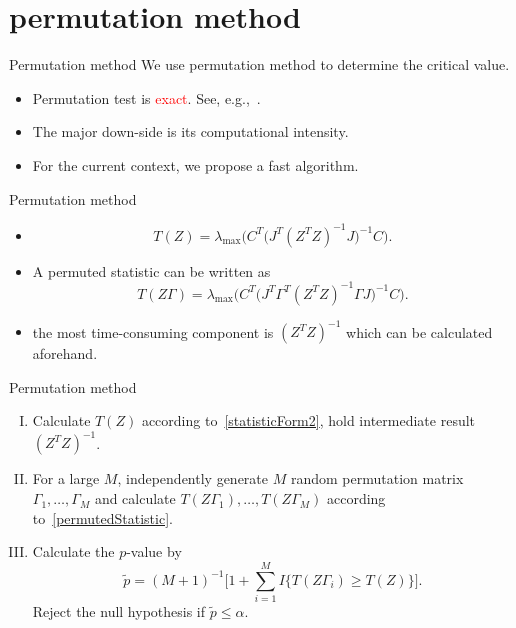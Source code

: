 \documentclass{beamer}
\theoremstyle{plain}
\theoremstyle{definition}
\theoremstyle{remark}
\begin{document}
\section{permutation method}
\begin{frame}{Permutation method}
    We use permutation method to determine the critical value.
    \begin{itemize}
        \item
            Permutation test is \textcolor{red}{exact}. See, e.g.,~\cite{Lehmann}.
        \item
        The major down-side is its computational intensity.
        \item
            For the current context, we propose a fast algorithm.
    \end{itemize}
\end{frame}
\begin{frame}{Permutation method}
    \begin{itemize}
        \item
            \begin{equation}\label{statisticForm2}
            T(Z)=\lambda_{\max}\Big(C^T\big(J^T (Z^T Z)^{-1}J\big)^{-1}C\Big).
            \end{equation}
        \item
            A permuted statistic can be written as
            \begin{equation}\label{permutedStatistic}
            T(Z\Gamma)=\lambda_{\max}\Big(C^T\big(J^T \Gamma^T (Z^T Z)^{-1} \Gamma J\big)^{-1}C\Big).
            \end{equation}
        \item
           the most time-consuming component is $(Z^T Z)^{-1}$ which can be calculated aforehand.
    \end{itemize}
\end{frame}
\begin{frame}{Permutation method}
    \begin{enumerate}[(I)]

\item Calculate $T(Z)$ according to~\eqref{statisticForm2}, hold intermediate result ${(Z^T Z)}^{-1}$.
\item For a large $M$, independently generate $M$ random permutation matrix $\Gamma_1,\ldots,\Gamma_M$ and calculate $T(Z\Gamma_1),\ldots,T(Z\Gamma_M)$ according to~\eqref{permutedStatistic}. 
\item Calculate the $p$-value by
$$
\tilde{p}={(M+1)}^{-1}\big[1+\sum_{i=1}^M I\{T(Z\Gamma_i)\geq T(Z)\}\big].
$$
Reject the null hypothesis if $\tilde{p}\leq \alpha$.
    \end{enumerate}
\end{frame}
\end{document}
